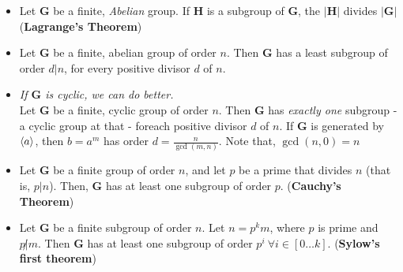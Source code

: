 \documentclass{article}
\begin{document}
  \begin{itemize}
    \item
      Let $\mathbf{G}$ be a finite, \emph{Abelian} group. If $\mathbf{H}$ is a
      subgroup of $\mathbf{G}$, the $|\mathbf{H}|$ divides $|\mathbf{G}|$
      ({\bf Lagrange's Theorem})

    \item
      Let $\mathbf{G}$ be a finite, abelian group of order $n$.
      Then $\mathbf{G}$ has a least subgroup of order $d | n$, for every
      positive divisor $d$ of $n$. 

    \item
      \emph{If $\mathbf{G}$ is cyclic, we can do better.}\\
      Let $\mathbf{G}$ be a finite, cyclic group of order $n$. Then $\mathbf{G}$
      has \emph{exactly one} subgroup - a cyclic group at that - foreach
      positive divisor $d$ of $n$. If $\mathbf{G}$ is generated by $\langle a \rangle$,
      then $b = a^m$ has order $d = \frac{n}{\gcd(m, n)}$.
      Note that, $\gcd(n, 0) = n$

    \item
      Let $\mathbf{G}$ be a finite group of order $n$, and let $p$ be a prime
      that divides $n$ (that is, $p | n$).  Then, $\mathbf{G}$ has at least one
      subgroup of order $p$. ({\bf Cauchy's Theorem})

    \item
      Let $\mathbf{G}$ be a finite subgroup of order $n$. Let $n = p^k m$, where
      $p$ is prime and $p\not | m$. Then $\mathbf{G}$ has at least one subgroup
      of order $p^i \ \forall i \in [0 \dots k]$. ({\bf Sylow's first theorem})

  \end{itemize}
\end{document}
